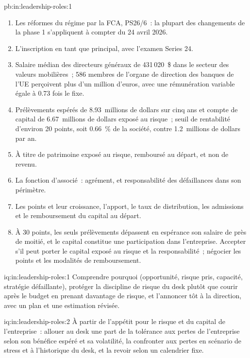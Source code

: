 \begin{solution}{pb:in:leadership-roles:1}
\begin{enumerate}
\item Les réformes du régime par la FCA, PS26/6~: la plupart des changements de la phase 1 s'appliquent à compter du 24 avril 2026.
\item L'inscription en tant que principal, avec l'examen Series 24.
\item Salaire médian des directeurs généraux de 431\,020~\$ dans le secteur des valeurs mobilières~; 586 membres de l'organe de direction des banques de l'UE
perçoivent plus d'un million d'euros, avec une rémunération variable égale à 0.73 fois le fixe.
\item Prélèvements espérés de 8.93~millions de dollars sur cinq ans et compte de capital de 6.67~millions de dollars exposé au risque~; seuil de rentabilité d'environ
20 points, soit 0.66~\% de la société, contre 1.2~millions de dollars par an.
\item À titre de patrimoine exposé au risque, remboursé au départ, et non de revenu.
\item La fonction d'associé~: agrément,  et responsabilité des défaillances dans son périmètre.
\item Les points et leur croissance, l'apport, le taux de distribution, les admissions et le remboursement du capital au départ.
\item À 30 points, les seuls prélèvements dépassent en espérance son salaire de près de moitié, et le capital constitue une participation dans
l'entreprise. Accepter s'il peut porter le capital exposé au risque et la responsabilité~; négocier les points et les modalités de remboursement.
\end{enumerate}
\end{solution}

\begin{solution}{iq:in:leadership-roles:1}
Comprendre pourquoi (opportunité, risque pris, capacité, stratégie défaillante), protéger la discipline de risque du desk plutôt que
courir après le budget en prenant davantage de risque, et l'annoncer tôt à la direction, avec un plan et une estimation révisée.
\end{solution}

\begin{solution}{iq:in:leadership-roles:2}
À partir de l'appétit pour le risque et du capital de l'entreprise~: allouer au desk une part de la tolérance aux pertes de l'entreprise selon
son bénéfice espéré et sa volatilité, la confronter aux pertes en scénario de stress et à l'historique du desk, et la revoir selon un calendrier fixe.
\end{solution}

